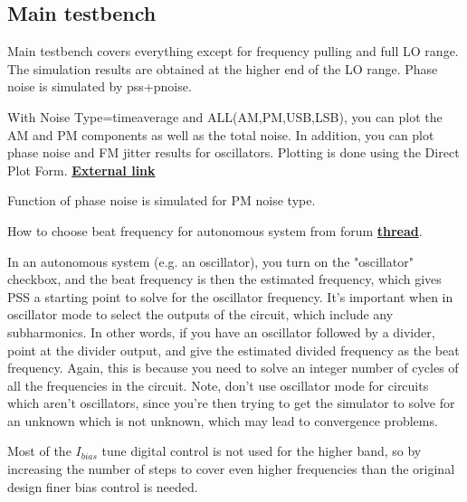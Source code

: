 \subsection{Main testbench}

Main testbench covers everything except for frequency pulling and full LO range. The simulation results are obtained at the higher end of the LO range. Phase noise is simulated by pss+pnoise.

\begin{info} %
	With Noise Type=timeaverage and ALL(AM,PM,USB,LSB), you can plot the AM and PM components as well as the total noise. In addition, you can plot phase noise and FM jitter results for oscillators. Plotting is done using the Direct Plot Form.
	\href{https://community.cadence.com/cadence_blogs_8/b/rf/posts/virtuoso-video-diary-noise-simulation-in-spectre-rf-using-improved-pnoise-hbnoise-and-direct-plot-form-options}{\textbf{External link}}
\end{info}

Function of phase noise is simulated for PM noise type.

How to choose beat frequency for autonomous system from forum \href{https://community.cadence.com/cadence_technology_forums/f/custom-ic-design/2661/beat-frequency-in-spectrerf-pss-simulation}{\textbf{thread}}.

\begin{info} %
In an autonomous system (e.g. an oscillator), you turn on the "oscillator" checkbox, and the beat frequency is then the estimated frequency, which gives PSS a starting point to solve for the oscillator frequency. It's important when in oscillator mode to select the outputs of the circuit, which include any subharmonics. In other words, if you have an oscillator followed by a divider, point at the divider output, and give the estimated divided frequency as the beat frequency. Again, this is because you need to solve an integer number of cycles of all the frequencies in the circuit. Note, don't use oscillator mode for circuits which aren't oscillators, since you're then trying to get the simulator to solve for an unknown which is not unknown, which may lead to convergence problems.
\end{info}

Most of the $I_{bias}$ tune digital control is not used for the higher band, so by increasing the number of steps to cover even higher frequencies than the original design finer bias control is needed.


